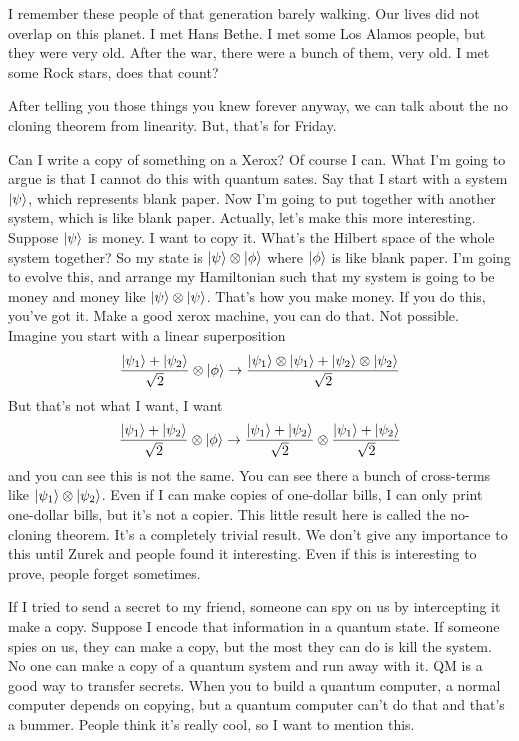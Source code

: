 I remember these people of that generation barely walking.
Our lives did not overlap on this planet.
I met Hans Bethe.
I met some Los Alamos people,
but they were very old.
After the war,
there were a bunch of them,
very old.
I met some Rock stars,
does that count?

After telling you those things
you knew forever anyway,
we can talk about the no cloning theorem from linearity.
But, that's for Friday.

Can I write a copy of something on a Xerox?
Of course I can.
What I'm going to argue is that I cannot do this with quantum sates.
Say that I start with a system $\ket{\psi}$,
which represents blank paper.
Now I'm going to put together with another system,
which is like blank paper.
Actually, let's make this more interesting.
Suppose $\ket{\psi}$ is money.
I want to copy it.
What's the Hilbert space of the whole system together?
So my state is $\ket{\psi}\otimes\ket{\phi}$
where $\ket{\phi}$ is like blank paper.
I'm going to evolve this,
and arrange my Hamiltonian such that my system is going to be money and money
like $\ket{\psi}\otimes\ket{\psi}$.
That's how you make money.
If you do this,
you've got it.
Make a good xerox machine,
you can do that.
Not possible.
Imagine you start with a linear superposition
\begin{align}
    \frac{\ket{\psi_1} + \ket{\psi_2}}{\sqrt{2}}
    \otimes\ket{\phi}
    \to
    \frac{\ket{\psi_1}\otimes\ket{\psi_1} + \ket{\psi_2}\otimes
    \ket{\psi_2}}{\sqrt{2}}
\end{align}
But that's not what I want,
I want
\begin{align}
    \frac{\ket{\psi_1} + \ket{\psi_2}}{\sqrt{2}}
    \otimes\ket{\phi}
    \to
    \frac{\ket{\psi_1} + \ket{\psi_2}}{\sqrt{2}}
    \otimes
    \frac{\ket{\psi_1} + \ket{\psi_2}}{\sqrt{2}}
\end{align}
and you can see this is not the same.
You can see there a bunch of cross-terms like
$\ket{\psi_1}\otimes\ket{\psi_2}$.
Even if I can make copies of one-dollar bills,
I can only print one-dollar bills,
but it's not a copier.
This little result here is called the no-cloning theorem.
It's a completely trivial result.
We don't give any importance to this until Zurek
and people found it interesting.
Even if this is interesting to prove,
people forget sometimes.

If I tried to send a secret to my friend,
someone can spy on us by intercepting it make a copy.
Suppose I encode that information in a quantum state.
If someone spies on us,
they can make a copy,
but the most they can do is kill the system.
No one can make a copy of a quantum system and run away with it.
QM is a good way to transfer secrets.
When you to build a quantum computer,
a normal computer depends on copying,
but a quantum computer can't do that
and that's a bummer.
People think it's really cool,
so I want to mention this.
